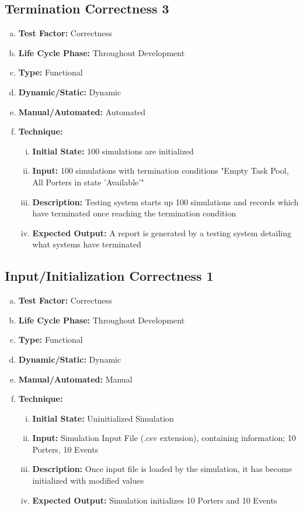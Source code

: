 \documentclass[paper=letter, fontsize=10pt]{scrartcl}
\numberwithin{equation}{section}		%
\numberwithin{figure}{section}			%
\numberwithin{table}{section}				%
\begin{document}
\subsection{Termination Correctness 3}
\begin{enumerate}[(a)]
	\item \textbf{Test Factor:} Correctness
	\item \textbf{Life Cycle Phase:} Throughout Development
	\item \textbf{Type:} Functional
	\item \textbf{Dynamic/Static:} Dynamic
	\item \textbf{Manual/Automated:} Automated
	\item \textbf{Technique:}
		\begin{enumerate}[(i)]
			\item \textbf{Initial State:} 100 simulations are initialized 
			\item \textbf{Input:} 100 simulations with termination conditions "Empty Task Pool, All Porters in state 'Available'"
			\item \textbf{Description:} Testing system starts up 100 simulations and records which have terminated once reaching the termination condition 
			\item \textbf{Expected Output:} A report is generated by a testing system detailing what systems have terminated
		\end{enumerate}
\end{enumerate}

\subsection{Input/Initialization Correctness 1}
\begin{enumerate}[(a)]
	\item \textbf{Test Factor:} Correctness  
	\item \textbf{Life Cycle Phase:} Throughout Development
	\item \textbf{Type:} Functional
	\item \textbf{Dynamic/Static:} Dynamic
	\item \textbf{Manual/Automated:} Manual
	\item \textbf{Technique:}
		\begin{enumerate}[(i)]
			\item \textbf{Initial State:} Uninitialized Simulation   
			\item \textbf{Input:} Simulation Input File (.csv extension), containing information; 10 Porters, 10 Events
			\item \textbf{Description:} Once input file is loaded by the simulation, it has become initialized with modified values
			\item \textbf{Expected Output:} Simulation initializes 10 Porters and 10 Events
		\end{enumerate}
\end{enumerate}
\end{document}
